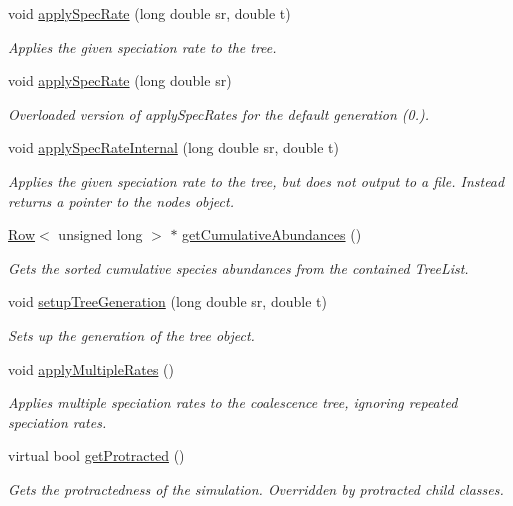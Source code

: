 \begin{DoxyCompactItemize}
void \hyperlink{class_tree_aa6349a32b3fcfb82a5f8311b11db3982}{apply\+Spec\+Rate} (long double sr, double t)
\begin{DoxyCompactList}\small\item\em Applies the given speciation rate to the tree. \end{DoxyCompactList}\item 
void \hyperlink{class_tree_ab699328f13b22f48faa63a5638e907db}{apply\+Spec\+Rate} (long double sr)
\begin{DoxyCompactList}\small\item\em Overloaded version of apply\+Spec\+Rates for the default generation (0.). \end{DoxyCompactList}\item 
void \hyperlink{class_tree_ac89abe0404d05d0363258b72cb80700b}{apply\+Spec\+Rate\+Internal} (long double sr, double t)
\begin{DoxyCompactList}\small\item\em Applies the given speciation rate to the tree, but does not output to a file. Instead returns a pointer to the nodes object. \end{DoxyCompactList}\item 
\hyperlink{class_row}{Row}$<$ unsigned long $>$ $\ast$ \hyperlink{class_tree_a49a94b2218f7ae127a53af4a58d02b06}{get\+Cumulative\+Abundances} ()
\begin{DoxyCompactList}\small\item\em Gets the sorted cumulative species abundances from the contained Tree\+List. \end{DoxyCompactList}\item 
void \hyperlink{class_tree_a9997b98824a786d9843a3df40de1226a}{setup\+Tree\+Generation} (long double sr, double t)
\begin{DoxyCompactList}\small\item\em Sets up the generation of the tree object. \end{DoxyCompactList}\item 
void \hyperlink{class_tree_acfc7efdec999f6dbf2ac089514d22091}{apply\+Multiple\+Rates} ()
\begin{DoxyCompactList}\small\item\em Applies multiple speciation rates to the coalescence tree, ignoring repeated speciation rates. \end{DoxyCompactList}\item 
virtual bool \hyperlink{class_tree_aa23a57f7863d58384f61d464d998ab3c}{get\+Protracted} ()
\begin{DoxyCompactList}\small\item\em Gets the protractedness of the simulation. Overridden by protracted child classes. \end{DoxyCompactList}\item 

\end{DoxyCompactItemize}
